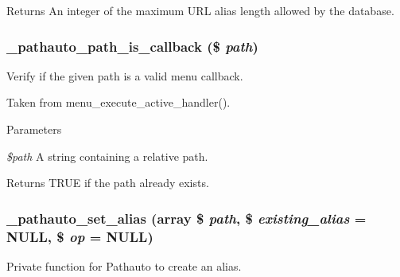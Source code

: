 \begin{DoxyReturn}{Returns}
An integer of the maximum URL alias length allowed by the database. 
\end{DoxyReturn}
\hypertarget{pathauto_8inc_a37f91c1fb2698d7280300505d2dcd55e}{
\subsubsection[{\_\-pathauto\_\-path\_\-is\_\-callback}]{\setlength{\rightskip}{0pt plus 5cm}\_\-pathauto\_\-path\_\-is\_\-callback (\$ {\em path})}}
\label{pathauto_8inc_a37f91c1fb2698d7280300505d2dcd55e}
Verify if the given path is a valid menu callback.

Taken from menu\_\-execute\_\-active\_\-handler().


\begin{DoxyParams}{Parameters}
\item[{\em \$path}]A string containing a relative path. \end{DoxyParams}
\begin{DoxyReturn}{Returns}
TRUE if the path already exists. 
\end{DoxyReturn}
\hypertarget{pathauto_8inc_a954e5a5c442176c91e5a8fead004f9f1}{
\subsubsection[{\_\-pathauto\_\-set\_\-alias}]{\setlength{\rightskip}{0pt plus 5cm}\_\-pathauto\_\-set\_\-alias (array \$ {\em path}, \/  \$ {\em existing\_\-alias} = {\ttfamily NULL}, \/  \$ {\em op} = {\ttfamily NULL})}}
\label{pathauto_8inc_a954e5a5c442176c91e5a8fead004f9f1}
Private function for Pathauto to create an alias.


